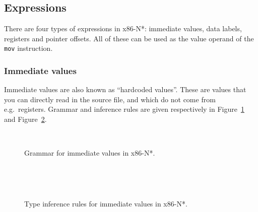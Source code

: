 \subsection{Expressions}\label{subsec:nstar-specific-x86amd64-exprs}

There are four types of expressions in x86-N*: immediate values, data labels, registers and pointer offsets.
All of these can be used as the value operand of the \texttt{mov} instruction.

\subsubsection{Immediate values}\label{subsubsec:nstar-specific-x86amd64-exprs-immediate}

Immediate values are also known as ``hardcoded values''.
These are values that you can directly read in the source file, and which do not come from e.g.\ registers.
Grammar and inference rules are given respectively in Figure~\ref{fig:nstar-specific-x86amd64-exprs-immediate-grammar} and Figure~\ref{fig:nstar-specific-x86amd64-exprs-immediate-typerules}.

\begin{figure}[H]
  \centering
  \\
  \caption{Grammar for immediate values in x86-N*.}
  \label{fig:nstar-specific-x86amd64-exprs-immediate-grammar}
\end{figure}

\begin{figure}[H]
  \centering

  \begin{prooftree}
  \end{prooftree}
  \\\vspace{\baselineskip}
  \begin{prooftree}
  \end{prooftree}
  \\\vspace{\baselineskip}
  \begin{prooftree}
  \end{prooftree}

  \caption{Type inference rules for immediate values in x86-N*.}
  \label{fig:nstar-specific-x86amd64-exprs-immediate-typerules}
\end{figure}

